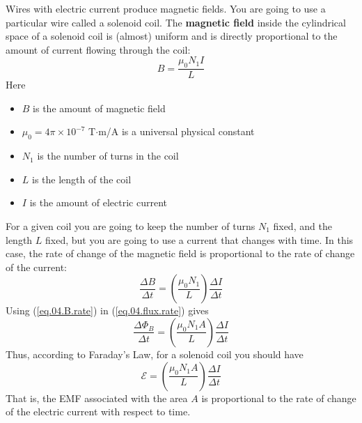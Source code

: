 Wires with electric current produce magnetic fields. You are going to use a particular wire called a solenoid coil. The \textbf{magnetic field} inside the cylindrical space of a solenoid coil is (almost) uniform and is directly proportional to the amount of current flowing through the coil:
\begin{equation}
	B = \frac{\mu_{0} N_{1} I}{L}
	\label{eq.04.B.coil}
\end{equation}
Here
\begin{itemize}
	\item $B$ is the amount of magnetic field
	\item $\mu_{0} = 4 \pi \times 10^{-7}$ T$\cdot$m/A  is a universal physical constant
	\item $N_{1}$ is the number of turns in the coil
	\item $L$ is the length of the coil
	\item $I$ is the amount of electric current
\end{itemize}
For a given coil you are going to keep the number of turns $N_{1}$ fixed, and the length $L$ fixed, but you are going to use a current that changes with time. In this case, the rate of change of the magnetic field is proportional to the rate of change of the current:
\begin{equation}
	\frac{\Delta B}{\Delta t} = \left( \frac{\mu_{0} N_{1}}{L} \right) \frac{\Delta I}{\Delta t}
	\label{eq.04.B.rate}
\end{equation}
Using (\ref{eq.04.B.rate}) in (\ref{eq.04.flux.rate}) gives
\begin{equation}
	\frac{\Delta \Phi_{B}}{\Delta t} = \left( \frac{\mu_{0} N_{1} A}{L} \right) \frac{\Delta I}{\Delta t}
\end{equation}
Thus, according to Faraday's Law, for a solenoid coil you should have
\begin{equation}
	\mathcal{E} = \left( \frac{\mu_{0} N_{1} A}{L} \right) \frac{\Delta I}{\Delta t}
	\label{eq.04.emf.solenoid}
\end{equation}
That is, the EMF associated with the area $A$ is proportional to the rate of change of the electric current with respect to time.
